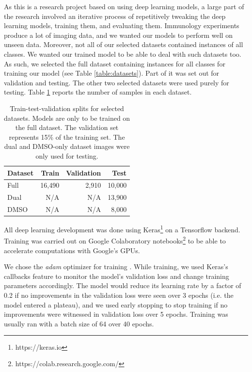 As this is a research project based on using deep learning models, a large part of the research involved an iterative process of repetitively tweaking the deep learning models, training them, and evaluating them. Immunology experiments produce a lot of imaging data, and we wanted our models to perform well on unseen data. Moreover, not all of our selected datasets contained instances of all classes. We wanted our trained model to be able to deal with such datasets too. As such, we selected the full dataset containing instances for all classes for training our model (see Table \ref{table:datasets}). Part of it was set out for validation and testing. The other two selected datasets were used purely for testing. Table \ref{table:splits} reports the number of samples in each dataset. 

\begin{table}[h]
\centering
\caption{Train-test-validation splits for selected datasets. Models are only to be trained on the full dataset. The validation set represents 15\% of the training set. The dual and DMSO-only dataset images were only used for testing.}
\begin{tabular}{|l|r|r|r|}
\hline
\rowcolor[HTML]{EFEFEF} 
Dataset       & Train  & Validation & Test   \\ \hline
Full & 16,490 & 2,910      & 10,000 \\
Dual   &     N/A   &     N/A       & 13,900 \\
DMSO       &     N/A      &        N/A       & 8,000  \\ \hline
\end{tabular}
\label{table:splits}
\end{table}

All deep learning development was done using Keras\footnote{https://keras.io} on a Tensorflow backend. Training was carried out on Google Colaboratory notebooks\footnote{https://colab.research.google.com/} to be able to accelerate computations with Google's GPUs. 

We chose the \textit{adam} optimizer for training \citep{kingma2014method}. While training, we used Keras's callbacks feature to monitor the model's validation loss and change training parameters accordingly. The model would reduce its learning rate by a factor of 0.2 if no improvements in the validation loss were seen over 3 epochs (i.e. the model entered a plateau), and we used early stopping to stop training if no improvements were witnessed in validation loss over 5 epochs. Training was usually ran with a batch size of 64 over 40 epochs. 

